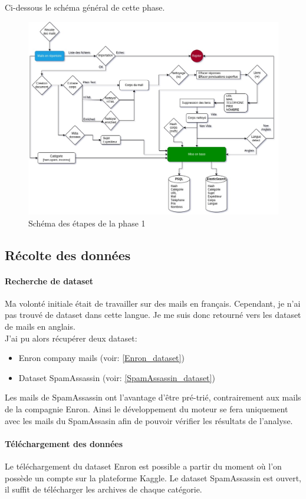 \documentclass[a4paper,12pt]{article}
\begin{document}
	Ci-dessous le schéma général de cette phase.
	\begin{figure}[H]
		\includegraphics[width=\linewidth]{img/SchemaPhase1.jpg}
		\caption{Schéma des étapes de la phase 1}
	\end{figure}


	\subsection{Récolte des données}
		\paragraph{Recherche de dataset}
			Ma volonté initiale était de travailler sur des mails en français. Cependant, je n'ai pas trouvé de dataset dans cette langue. Je me suis donc retourné vers les dataset de mails en anglais. \\
			J'ai pu alors récupérer deux dataset:
			\begin{itemize}
				\item Enron company mails (voir: \ref{Enron_dataset})
				\item Dataset SpamAssassin (voir: \ref{SpamAssassin_dataset})
			\end{itemize}
			Les mails de SpamAssassin ont l'avantage d'être pré-trié, contrairement aux mails de la compagnie Enron. Ainsi le développement du moteur se fera uniquement avec les mails du SpamAssasin afin de pouvoir vérifier les résultats de l'analyse. 
		
		\paragraph{Téléchargement des données}
			Le téléchargement du dataset Enron est possible a partir du moment où l'on possède un compte sur la plateforme Kaggle. Le dataset SpamAssassin est ouvert, il suffit de télécharger les archives de chaque catégorie. \\
			
\end{document}
